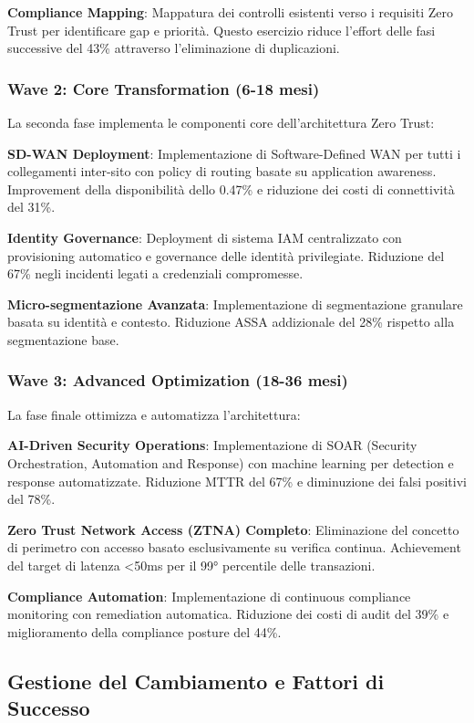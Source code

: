 \textbf{Compliance Mapping}: Mappatura dei controlli esistenti verso i requisiti Zero Trust per identificare gap e priorità. 
Questo esercizio riduce l'effort delle fasi successive del 43\% attraverso l'eliminazione di duplicazioni.

\subsubsection{Wave 2: Core Transformation (6-18 mesi)}

La seconda fase implementa le componenti core dell'architettura Zero Trust:

\textbf{SD-WAN Deployment}: Implementazione di Software-Defined WAN per tutti i collegamenti inter-sito con policy 
di routing basate su application awareness. Improvement della disponibilità dello 0.47\% e riduzione dei costi di connettività del 31\%.

\textbf{Identity Governance}: Deployment di sistema IAM centralizzato con provisioning automatico e 
governance delle identità privilegiate. Riduzione del 67\% negli incidenti legati a credenziali compromesse.

\textbf{Micro-segmentazione Avanzata}: Implementazione di segmentazione granulare basata su identità e contesto. 
Riduzione ASSA addizionale del 28\% rispetto alla segmentazione base.

\subsubsection{Wave 3: Advanced Optimization (18-36 mesi)}

La fase finale ottimizza e automatizza l'architettura:

\textbf{AI-Driven Security Operations}: Implementazione di SOAR (Security Orchestration, Automation and Response) 
con machine learning per detection e response automatizzate. Riduzione MTTR del 67\% e diminuzione dei falsi positivi del 78\%.

\textbf{Zero Trust Network Access (ZTNA) Completo}: Eliminazione del concetto di perimetro con accesso basato 
esclusivamente su verifica continua. Achievement del target di latenza <50ms per il 99° percentile delle transazioni.

\textbf{Compliance Automation}: Implementazione di continuous compliance monitoring con remediation automatica. 
Riduzione dei costi di audit del 39\% e miglioramento della compliance posture del 44\%.

\subsection{Gestione del Cambiamento e Fattori di Successo}

